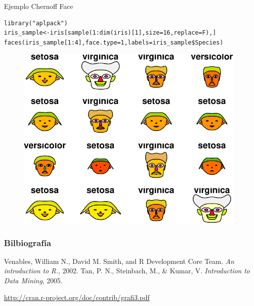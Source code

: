 \documentclass[handout]{beamer}
\begin{document}
\begin{frame}[fragile]{Ejemplo Chernoff Face}
\scriptsize{
\begin{verbatim}
library("aplpack")
iris_sample<-iris[sample(1:dim(iris)[1],size=16,replace=F),]
faces(iris_sample[1:4],face.type=1,labels=iris_sample$Species)
\end{verbatim}

  \begin{figure}[h!]
	\centering
	\includegraphics[scale=0.6]{imagenes/faces.pdf}		
\end{figure}   




}
 
\end{frame}



\begin{frame}[allowframebreaks]\scriptsize
\frametitle{Bilbiografía}
%
%
\begin{thebibliography}{8}

Venables, William N., David M. Smith, and R Development Core Team. \emph{An introduction to R.}, 2002.
Tan, P. N., Steinbach, M., \& Kumar, V. \emph{Introduction to Data Mining}, 2005.

\url{http://cran.r-project.org/doc/contrib/grafi3.pdf}
\end{thebibliography}


%
\end{frame}










\end{document}
